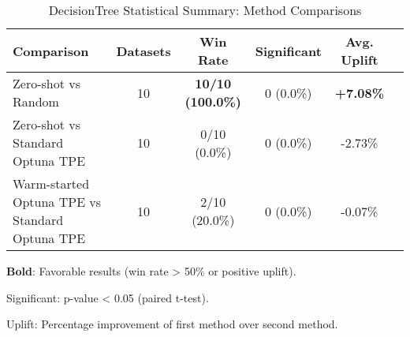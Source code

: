 \begin{table}[htbp]
\centering
\caption{DecisionTree Statistical Summary: Method Comparisons}
\label{tab:decisiontree_stats_summary}
\begin{tabular}{lccccc}
\toprule
Comparison & Datasets & Win Rate & Significant & Avg. Uplift \\
\midrule
Zero-shot vs Random & 10 & \textbf{10/10 (100.0\%)} & 0 (0.0\%) & \textbf{+7.08\%} \\
Zero-shot vs Standard Optuna TPE & 10 & 0/10 (0.0\%) & 0 (0.0\%) & -2.73\% \\
Warm-started Optuna TPE vs Standard Optuna TPE & 10 & 2/10 (20.0\%) & 0 (0.0\%) & -0.07\% \\
\bottomrule
\end{tabular}
\begin{tablenotes}
\small
\item \textbf{Bold}: Favorable results (win rate > 50\% or positive uplift).
\item Significant: p-value < 0.05 (paired t-test).
\item Uplift: Percentage improvement of first method over second method.
\end{tablenotes}
\end{table}